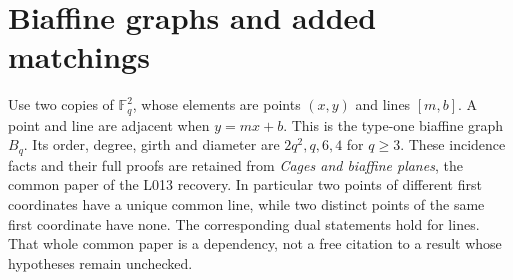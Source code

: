 \documentclass[11pt,a4paper]{article}
\newcommand{\F}{\mathbb F}
\begin{document}
\section{Biaffine graphs and added matchings}
Use two copies of $\F_q^2$, whose elements are points $(x,y)$ and lines
$[m,b]$. A point and line are adjacent when $y=mx+b$. This is the
type-one biaffine graph $B_q$. Its order, degree, girth and diameter
are $2q^2,q,6,4$ for $q\geq3$. These incidence facts and their full
proofs are retained from \emph{Cages and biaffine planes}, the common
paper of the L013 recovery. In particular two points of different first
coordinates have a unique common line, while two distinct points of the
same first coordinate have none. The corresponding dual statements hold
for lines. That whole common paper is a dependency, not a free citation
to a result whose hypotheses remain unchecked.
\end{document}
